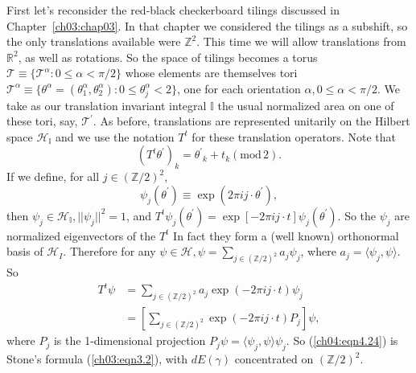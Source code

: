 \documentclass[reqno]{stml-l}
\theoremstyle{plain}
\theoremstyle{definition}
\numberwithin{equation}{chapter}
\begin{document}
First let's reconsider the red-black checkerboard tilings discussed in Chapter~\ref{ch03:chap03}. In that chapter we considered the tilings as a subshift, so the only translations available were $\mathbb{Z}^{2}$. This time we will allow translations from $\mathbb{R}^{2}$, as well as rotations. So the space of tilings becomes a torus $\mathcal{T}\equiv\{\mathcal{T}^{\alpha} :0\leq\alpha<\pi/2\}$ whose elements are themselves tori $\mathcal{T}^{\alpha}\equiv\{\theta^{\alpha}=(\theta_{1}^{\alpha}, \theta_{2}^{\alpha}):0\leq\theta_{j}^{\alpha}<2\}$, one for each orientation $\alpha,0\leq\alpha<\pi/2$. We take as our translation invariant integral $\mathbb{I}$ the usual normalized area on one of these tori, say, $\mathcal{T}^{\prime}$. As before, translations are represented unitarily on the Hilbert space $\mathcal{H}_{\mathbb{I}}$ and we use the notation $T^{t}$ for these translation operators. Note that
\begin{equation}\label{ch04:eqn4.22}
(T^{t}\theta^{\prime})_{k}=\theta^{\prime}{_{k}}+t_{k}(\mathrm{mod}\,2). \end{equation}
If we define, for all $j\in(\mathbb{Z}/2)^{2}$,
\begin{equation}\label{ch04:eqn4.23}
\psi_{j}(\theta^{\prime})\equiv\exp(2\pi ij\cdot\theta^{\prime}),
\end{equation}
then $\psi_{j}\in \mathcal{H}_{\mathbb{I}},||\psi_{j}||^{2}=1$, and $T^{t}\psi_{j}(\theta^{\prime})=\exp[-2\pi ij\cdot t]\psi_{j}(\theta^{\prime})$. So the $\psi_{j}$ are normalized eigenvectors of the $T^{t}$ In fact they form a (well known) orthonormal basis of $\mathcal{H}_{I}$. Therefore for any $\psi\in \mathcal{H},\psi=\sum\nolimits_{j\in(\mathbb{Z}/2)^{2}}a_{j}\psi_{j}$, where $a_{j}=\langle\psi_{j},\psi\rangle$. So
\begin{equation}
\begin{split}\label{ch04:eqn4.24}
T^{t}\psi&=\sum\limits_{j\in(\mathbb{Z}/2)^{2}}a_{j}\exp(-2\pi ij\cdot t)\psi_{j}\\
&=[\sum\limits_{j\in(\mathbb{Z}/2)^{2}}\exp(-2\pi ij\cdot t)P_{j}]\psi,
\end{split}
\end{equation}
where $P_{j}$ is the 1-dimensional projection $P_{j}\psi=\langle\psi_{j},\psi\rangle\psi_{j}$. So (\ref{ch04:eqn4.24}) is Stone's formula (\ref{ch03:eqn3.2}), with $dE(\gamma)$ concentrated on $(\mathbb{Z}/2)^{2}$.
\end{document}

